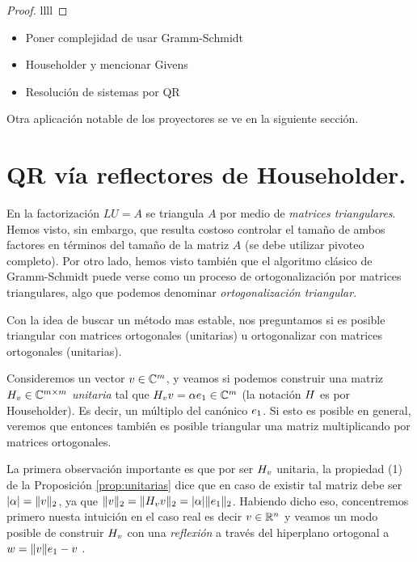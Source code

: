 \begin{tcolorbox}
\begin{proof}
 llll
\end{proof}


\begin{itemize}
 \item Poner complejidad de usar Gramm-Schmidt
 \item Householder y mencionar Givens
 \item Resolución de sistemas por QR
\end{itemize}



Otra aplicación notable de los proyectores se ve en la siguiente sección.

\section{QR vía reflectores de Householder.}

En la factorización $LU=A$ se triangula $A$ por medio de \emph{matrices triangulares}. Hemos visto, sin embargo,  que resulta costoso controlar el tamaño de ambos factores en términos del tamaño de la matriz $A$ (se debe utilizar pivoteo completo). Por otro lado, hemos visto también que el algoritmo clásico de Gramm-Schmidt puede verse como un proceso de ortogonalización por matrices triangulares, algo que podemos denominar \emph{ortogonalización triangular}.

Con la idea de buscar un método mas estable, nos preguntamos si es posible triangular con matrices ortogonales (unitarias) u
ortogonalizar con matrices ortogonales (unitarias).


Consideremos un vector  $\vb\in \Cm$, y veamos si podemos construir una matriz $\Hbb_{\vb}\in \Cmm$ \emph{unitaria} tal que $\Hbb_{\vb}\vb=\alpha\eb_1\in \Cm$ (la notación $\Hb$ es por Householder). Es decir, un múltiplo del canónico $\eb_1$.
Si esto es posible en general, veremos que entonces también es posible  triangular una matriz multiplicando por matrices ortogonales.

La primera observación importante es que por ser $\Hbb_{\vb}$ unitaria, la propiedad (1) de la Proposición \ref{prop:unitarias} dice que en caso de existir tal matriz debe ser $|\alpha|=\|\vb\|_2$, ya que $\|\vb\|_2=\|\Hbb_{\vb}\vb\|_2=|\alpha|\|\eb_1\|_2$.  Habiendo dicho eso, concentremos primero nuesta intuición en el caso real es decir $\vb\in \R^n$ y veamos un modo  posible  de construir $\Hbb_{\vb}$ con  una \emph{reflexión} a través del hiperplano ortogonal a $\wb=\|\vb\|\eb_1-\vb$  .


\end{tcolorbox}
